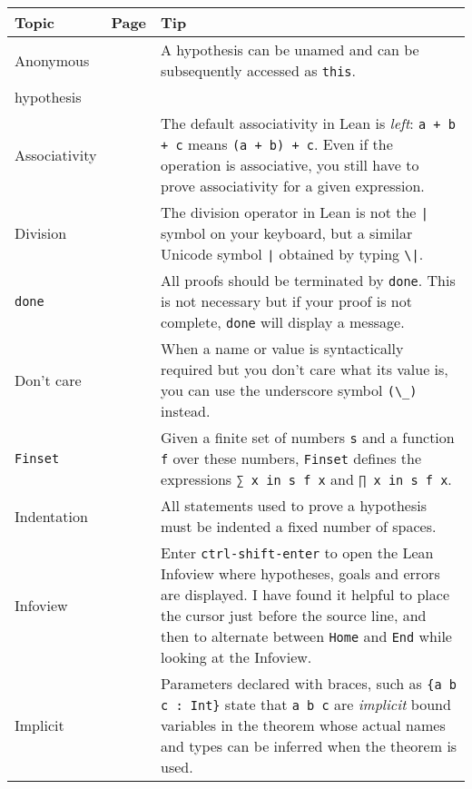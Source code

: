 \begin{tabular}{p{}|r|p{}}
\hline
Topic & Page & Tip\\
\hline
Anonymous&\pageref{p.this}&A hypothesis can be unamed and can be subsequently accessed as \Verb+this+.\\
hypothesis&\\\hline
Associativity&\pageref{p.associativity}&The default associativity in Lean is \emph{left}: \verb!a + b + c! means \verb!(a + b) + c!. Even if the operation is associative, you still have to prove associativity for a given expression.\\\hline

Division&\pageref{p.division}&The division operator in Lean is not the \Verb+|+ symbol on your keyboard, but a similar Unicode symbol \Verb+∣+ obtained by typing \Verb+\|+.\\\hline

\Verb+done+&\pageref{p.done}&All proofs should be terminated by \Verb+done+. This is not necessary but if your proof is not complete, \Verb+done+ will display a message.\\\hline

Don't care&\pageref{p.dont-care}&When a name or value is syntactically required but you don't care what its value is, you can use the underscore symbol \Verb+(\_)+ instead.\\\hline

\Verb+Finset+&\pageref{p.finset}&Given a finite set of numbers \Verb+s+ and a function \Verb+f+ over these numbers, \Verb+Finset+ defines the expressions \Verb+∑ x in s f x+ and \Verb+∏ x in s f x+.\\\hline

Indentation&\pageref{p.indentation}&All statements used to prove a hypothesis must be indented a fixed number of spaces.\\\hline

Infoview&\pageref{p.infoview}&Enter \Verb+ctrl-shift-enter+ to open the Lean Infoview where hypotheses, goals and errors are displayed. I have found it helpful to place the cursor just before the source line, and then to alternate between \Verb+Home+ and \Verb+End+ while looking at the Infoview.\\\hline

Implicit&\pageref{p.implicit}&Parameters declared with braces, such as \Verb+{a b c : Int}+ state that \Verb+a b c+ are \emph{implicit} bound variables in the theorem whose actual names and types can be inferred when the theorem is used.\\\hline


\end{tabular}
